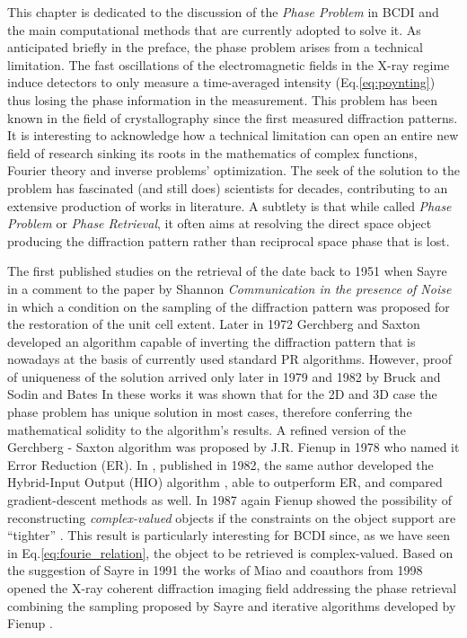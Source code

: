 
This chapter is dedicated to the discussion of the \textit{Phase Problem} in BCDI and the main computational methods 
that are currently adopted to solve it. As anticipated briefly in the preface, the phase problem arises from a technical 
limitation. The fast oscillations of the electromagnetic fields in the X-ray regime induce detectors to only measure 
a time-averaged intensity (Eq.\ref{eq:poynting}) thus losing the phase information in the measurement. This problem 
has been known in the field of crystallography since the first measured diffraction patterns. It is interesting to acknowledge 
how a technical limitation can open an entire new field of research sinking its roots in the mathematics of complex functions, 
Fourier theory and inverse problems' optimization. The seek of the solution 
to the problem has fascinated (and still does) scientists for decades, contributing to an extensive production of works in 
literature. A subtlety is that while called \textit{Phase Problem} or \textit{Phase Retrieval}, it often aims at resolving 
the direct space object producing the diffraction pattern rather than reciprocal space phase that is lost. 

The first published studies on the retrieval of the date back to 1951 when Sayre in a comment \cite{Sayre_1952} to the paper by 
Shannon \textit{Communication in the presence of Noise} \cite{Shannon_1949} in which a condition on the sampling of the diffraction 
pattern was proposed for the restoration of the unit cell extent. Later in 1972 Gerchberg and Saxton \cite{gerchberg1972} developed an 
algorithm capable of inverting the diffraction pattern that is nowadays at the basis of currently used standard PR algorithms. 
However, proof of uniqueness of the solution arrived only later in 1979 and 1982 by Bruck and Sodin \cite{BruckSodin1979} and 
Bates \cite{Bates1982} In these works it was shown that for the 2D and 3D case the phase problem has unique solution in most cases, therefore 
conferring the mathematical solidity to the algorithm's results. A refined version of the Gerchberg - Saxton algorithm 
was proposed by J.R. Fienup in 1978 \cite{fienup_reconstruction_1978}
who named it Error Reduction (ER). In \cite{fienup_phase_1982}, published in 1982, the same author developed the Hybrid-Input Output (HIO) algorithm , 
able to outperform ER, and compared gradient-descent methods as well. In 1987 again Fienup showed the possibility of reconstructing 
\textit{complex-valued} objects if the constraints on the object support are ``tighter'' \cite{Fienup1987}. This result is 
particularly interesting for BCDI since, as we have seen in Eq.\ref{eq:fourie_relation}, the object to be retrieved is 
complex-valued. Based on the suggestion of Sayre in 1991 \cite{sayre1991direct} the works of Miao and coauthors from 1998 
opened the X-ray coherent diffraction imaging field addressing the phase retrieval combining the sampling proposed by Sayre and
iterative algorithms developed by Fienup \cite{Miao1998, Miao1999, Miao2000}.

